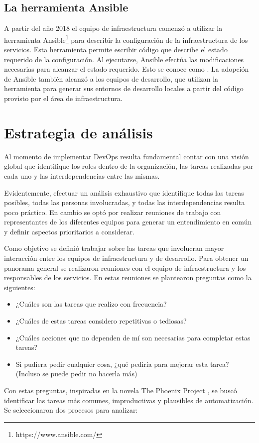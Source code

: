 \subsection{La herramienta Ansible}

A partir del año 2018 el equipo de infraestructura comenzó a utilizar
la herramienta Ansible\footnote{ https://www.ansible.com/} para
describir la configuración de la infraestructura de los
servicios. Esta herramienta permite escribir código que describe el
estado requerido de la configuración. Al ejecutarse, Ansible efectúa
las modificaciones necesarias para alcanzar el estado requerido. Esto
se conoce como . La adopción de
Ansible también alcanzó a los equipos de desarrollo, que utilizan la
herramienta para generar sus entornos de desarrollo locales a partir
del código provisto por el área de infraestructura.

\section{Estrategia de análisis}

Al momento de implementar DevOps resulta fundamental contar con una
visión global que identifique los roles dentro de la organización, las
tareas realizadas por cada uno y las interdependencias entre las
mismas.

Evidentemente, efectuar un análisis exhaustivo que identifique todas
las tareas posibles, todas las personas involucradas, y todas las
interdependencias resulta poco práctico. En cambio se optó por
realizar reuniones de trabajo con representantes de los diferentes
equipos para generar un entendimiento en común y definir aspectos
prioritarios a considerar.

Como objetivo se definió trabajar sobre las tareas que involucran
mayor interacción entre los equipos de infraestructura y de
desarrollo. Para obtener un panorama general se realizaron reuniones
con el equipo de infraestructura y los responsables de los
servicios. En estas reuniones se plantearon preguntas como la
siguientes:

\begin{itemize}
\item ¿Cuáles son las tareas que realizo con frecuencia?
\item ¿Cuáles de estas tareas considero repetitivas o tediosas?
\item ¿Cuáles acciones que no dependen de mí son necesarias para
  completar estas tareas?
\item Si pudiera pedir cualquier cosa, ¿qué pediría para mejorar esta
  tarea? (Incluso se puede pedir no hacerla más)
\end{itemize}
Con estas preguntas, inspiradas en la novela The Phoenix Project
\cite{phoenix}, se buscó
identificar las tareas más comunes, improductivas y plausibles de
automatización. Se seleccionaron dos procesos para analizar:

